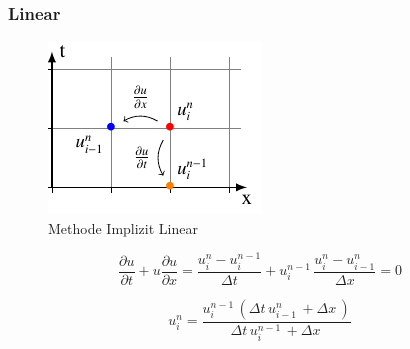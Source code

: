 \subsubsection{Linear}
     \begin{figure}[!ht]
	\centering
	\includegraphics[height=.4\textwidth]{papers/burgers/BurgersEquation/tikz/linear5/linear5.pdf}
	\caption{Methode Implizit Linear}
	\label{burgers:fig:linear5}
	\end{figure}
	
	\begin{equation}
	\frac {\partial u}{\partial t}+u{\frac {\partial u}{\partial x}} = \frac{u_{i}^{n}-u_{i}^{n-1}}{\Delta t}+ u_{i}^{n-1}\, \frac{u_{i}^{n}-u_{i-1}^{n}}{\Delta x}=0
	\end{equation}
	
	\begin{equation}
	 u_{i}^{n} = \frac{u^{n-1}_{i}\, \left(\Delta{t}\, u^{n}_{i-1}\, + \Delta{x}\,\right)}{\Delta{t}\, u^{n-1}_{i}\, + \Delta{x}\,}
	\end{equation}